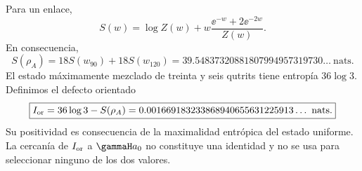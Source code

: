 Para un enlace,
\begin{equation}
\label{rm:eq:modular-link-entropy}
S(w)=\log Z(w)
+w\frac{\ee^{-w}+2\ee^{-2w}}{Z(w)}.
\end{equation}
En consecuencia,
\begin{equation}
\label{rm:eq:modular-entropy-value}
S(\rho_A)=18S(w_{90})+18S(w_{120})
=39.54837320881807994957319730\ldots\ \text{nats}.
\end{equation}
El estado m\'aximamente mezclado de treinta y seis qutrits tiene entrop\'ia
\(36\log3\). Definimos el defecto orientado
\begin{equation}
\label{rm:eq:modular-oriented-information}
\boxed{
I_{\rm or}=36\log3-S(\rho_A)
=0.001669183233868940655631225913\ldots\ \text{nats}.}
\end{equation}
Su positividad es consecuencia de la maximalidad entr\'opica del estado
uniforme. La cercan\'ia de \(I_{\rm or}\) a \(\gammaH a_0\) no constituye
una identidad y no se usa para seleccionar ninguno de los dos valores.
